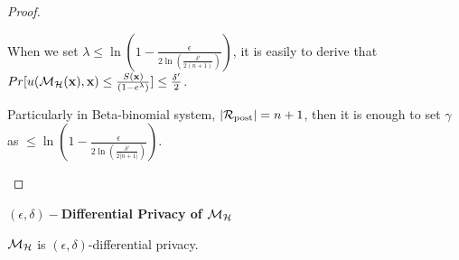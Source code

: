 \documentclass{article}
\begin{document}
\begin{proof}
\begin{itemize}
		When we set $\lambda \leq \ln(1 - \frac{\epsilon}{2 \ln (\frac{\delta'}{2 (n + 1)})})$, it is easily to derive that $Pr[u(\mathcal{M}_{\mathcal{H}}(\textbf{x}), \textbf{x}) \leq \frac{S(\textbf{x})}{(1 - e ^ {\lambda})}] \leq \frac{\delta'}{2}$.

		Particularly in Beta-binomial system, $|\mathcal{R}_{\textup{post}}| = n + 1$, then it is enough to set $\gamma$ as $ \leq \ln(1 - \frac{\epsilon}{2 \ln (\frac{\delta'}{2 |n + 1|})})$.

\end{itemize}

\end{proof}

\noindent \textbf{$(\epsilon, \delta)-$Differential Privacy of $\mathcal{M}_{\mathcal{H}}$}
\begin{lem}
\label{lem_hexpmech_privacy}
$\mathcal{M}_{\mathcal{H}}$ is $(\epsilon, \delta)$-differential privacy.
\end{lem}
\end{document}
